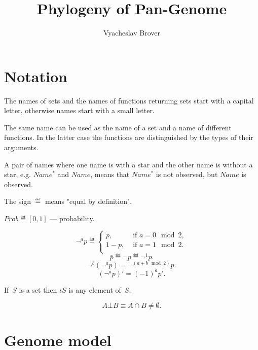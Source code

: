 \documentclass[10pt,a4paper]{article}
\title{Phylogeny of Pan-Genome}
\author{Vyacheslav Brover}
\theoremstyle{plain} \newtheorem{Lem}{Lemma}
\begin{document}
\maketitle

\tableofcontents


\section{Notation}
The names of sets and the names of functions returning sets start with a capital letter, otherwise names start with a small letter.

The same name can be used as the name of a set and a name of different functions. 
In the latter case the functions are distinguished by the types of their arguments.

A pair of names where one name is with a star and the other name is without a star, e.g. $Name^*$ and $Name$, means that $Name^*$ is not observed, but $Name$ is observed.

The sign $\eqdef$ means "equal by definition".

$ Prob \eqdef [0,1] $ --- probability.

\begin{equation*}
\neg^a p \eqdef
  \begin{cases}
    p,          &\text{ if } a = 0 \mod 2,\\
    1-p,        &\text{ if } a = 1 \mod 2.\\
  \end{cases}   
\end{equation*}
$$ \bar p \eqdef \neg p \eqdef \neg^1 p. $$
$$ \neg^b (\neg^a p) = \neg^{(a+b\mod 2)} p. $$
$$ (\neg^a p)' = (-1)^a p'. $$

If~$S$ is a set then $\iota S$ is any element of~$S$.

$$ A \bot B \equiv A \cap B \ne \emptyset. $$


\section {Genome model}
\end{document}
